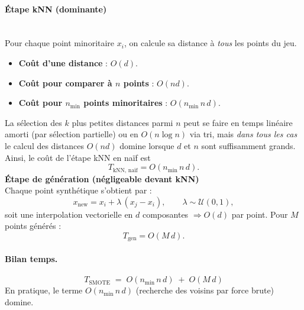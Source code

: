 \documentclass{article}
\begin{document}
\paragraph{Étape kNN (dominante)} \cite{sklearnNeighbors}
\\
Pour chaque point minoritaire $x_i$, on calcule sa distance à \emph{tous} les points du jeu.
\begin{itemize}
  \item \textbf{Coût d'une distance} : $O(d)$.
  \item \textbf{Coût pour comparer à $n$ points} : $O(nd)$.
  \item \textbf{Coût pour $n_{\text{min}}$ points minoritaires} : $O(n_{\text{min}}\,n\,d)$.
\end{itemize}
La sélection des $k$ plus petites distances parmi $n$ peut se faire en temps linéaire amorti
(par sélection partielle) ou en $O(n\log n)$ via tri, mais \emph{dans tous les cas} le calcul des distances
$O(nd)$ domine lorsque $d$ et $n$ sont suffisamment grands. Ainsi, le coût de l’étape kNN en naïf est
\[
T_{\text{kNN, naïf}} = O(n_{\text{min}}\,n\,d).
\]
\vspace{0.5cm}
\textbf{Étape de génération (négligeable devant kNN)}
\\
Chaque point synthétique s’obtient par :
\[
x_{\text{new}} = x_i + \lambda\,(x_j - x_i), \qquad \lambda\sim\mathcal{U}(0,1),
\]
soit une interpolation vectorielle en $d$ composantes $\Rightarrow O(d)$ par point.
Pour $M$ points générés :
\[
T_{\text{gen}} = O(M\,d).
\]

\paragraph{Bilan temps.}
\[
\boxed{ \; T_{\text{SMOTE}} \;=\; O(n_{\text{min}}\,n\,d) \;+\; O(M\,d) \;}
\]
En pratique, le terme $O(n_{\text{min}}\,n\,d)$ (recherche des voisins par force brute) domine.

\newpage

\printbibliography
\end{document}
